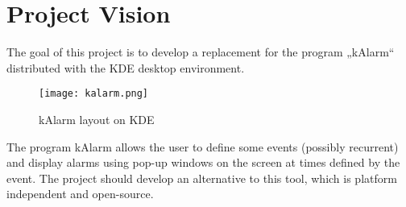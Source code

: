 \chapter{Project Vision}

The goal of this project is to develop a replacement for the
program „kAlarm“ distributed with the KDE desktop
environment.

\begin{figure}[h]
\centering
\caption{kAlarm layout on KDE}
\texttt{[image: kalarm.png]}
\end{figure}

The program kAlarm allows the user to define some events
(possibly recurrent) and display alarms using pop-up windows
on the screen at times defined by the event. The project should
develop an alternative to this tool, which is platform
independent and open-source.